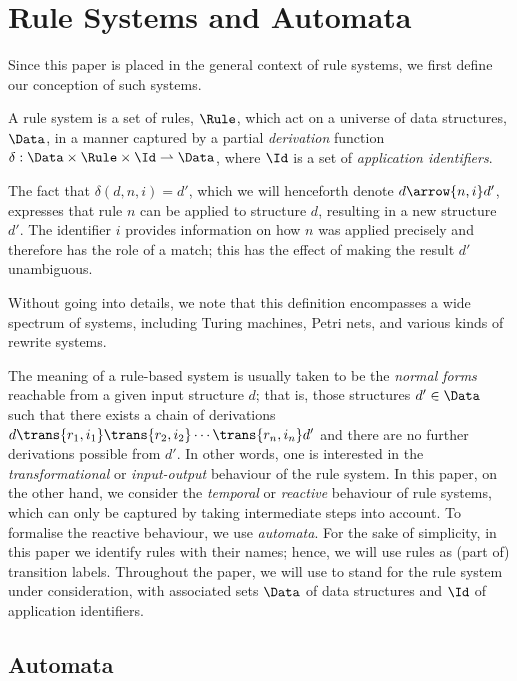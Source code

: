 \section{Rule Systems and Automata}\label{sec:automata}

Since this paper is placed in the general context of rule systems, we first
define our conception of such systems.

\begin{definition}\label{def:rule}
  A rule system is a set of rules, $\Rule$, which act on a universe of data
  structures, $\Data$, in a manner captured by a partial \emph{derivation}
  function $\delta: \Data\times \Rule\times \Id\rightharpoonup \Data$, where
  $\Id$ is a set of \emph{application identifiers}.
\end{definition}
%
The fact that $\delta(d,n,i)=d'$, which we will henceforth denote
$d\arrow{n,i}d'$, expresses that rule $n$ can be applied to structure $d$,
resulting in a new structure $d'$. The identifier $i$ provides information on
how $n$ was applied precisely and therefore has the role of a match;
this has the effect of making the result $d'$ unambiguous.

Without going into details, we note that this definition encompasses a wide
spectrum of systems, including Turing machines, Petri nets, and various kinds
of rewrite systems.

The meaning of a rule-based system is usually taken to be the \emph{normal
forms} reachable from a given input structure $d$; that is, those structures
$d'\in \Data$ such that there exists a chain of derivations $d \trans{r_1,i_1}
\trans{r_2,i_2} \cdots \trans{r_n,i_n} d'$ and there are no further derivations
possible from $d'$. In other words, one is interested in the
\emph{transformational} or \emph{input-output} behaviour of the rule system. In
this paper, on the other hand, we consider the \emph{temporal} or
\emph{reactive} behaviour of rule systems, which can only be captured by taking
intermediate steps into account. To formalise the reactive behaviour, we use
\emph{automata}.  For the sake of simplicity, in this paper we identify rules
with their names; hence, we will use rules as (part of) transition labels.
Throughout the paper, we will use \Rule{} to stand for the rule system under
consideration, with associated sets $\Data$ of data structures and $\Id$ of
application identifiers.

\subsection{Automata}
\label{sec:aut}


